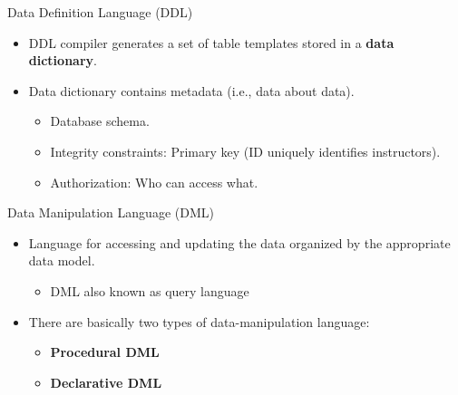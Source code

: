 \documentclass[aspectratio=169]{beamer}
\begin{document}
\begin{frame}{Data Definition Language (DDL)}
    \begin{itemize}
        \item DDL compiler generates a set of table templates stored in a \textbf{data dictionary}.
        \item Data dictionary contains metadata (i.e., data about data).
        \begin{itemize}
            \item Database schema.
            \item Integrity constraints: Primary key (ID uniquely identifies instructors).
            \item Authorization: Who can access what.
        \end{itemize}
    \end{itemize}
\end{frame}

\begin{frame}{Data Manipulation Language (DML)}
    \begin{itemize}
        \item Language for accessing and updating the data organized by the appropriate data model.
        \begin{itemize}
            \item DML also known as query language
        \end{itemize}
        \item There are basically two types of data-manipulation language:
        \begin{itemize}
            \item \textbf{Procedural DML}
            \item \textbf{Declarative DML}
        \end{itemize}
    \end{itemize}
\end{frame}
\end{document}
